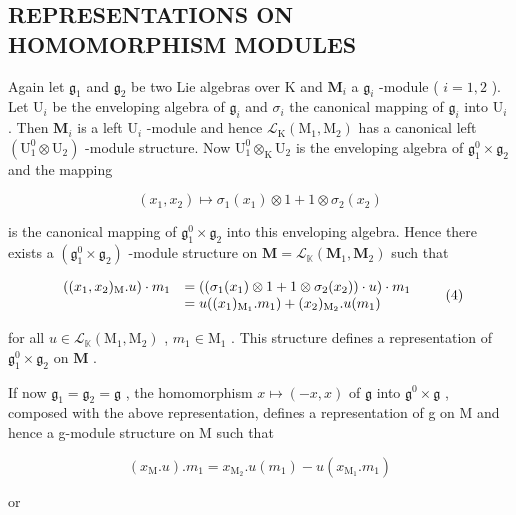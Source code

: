 \subsection{REPRESENTATIONS ON HOMOMORPHISM MODULES}

Again let \(\mathfrak{g}_1\) and \(\mathfrak{g}_2\) be two Lie algebras over K and \(\mathbf{M}_i\) a \(\mathfrak{g}_i\) -module ( \(i = 1, 2\) ). Let \(\mathrm{U}_i\) be the enveloping algebra of \(\mathfrak{g}_i\) and \(\sigma_i\) the canonical mapping of \(\mathfrak{g}_i\) into \(\mathrm{U}_i\) . Then \(\mathbf{M}_i\) is a left \(\mathrm{U}_i\) -module and hence \(\mathcal{L}_{\mathrm{K}}(\mathrm{M}_1, \mathrm{M}_2)\) has a canonical left \((\mathrm{U}_1^0 \otimes \mathrm{U}_2)\) -module structure. Now \(\mathrm{U}_1^0 \otimes_{\mathrm{K}} \mathrm{U}_2\) is the enveloping algebra of \(\mathfrak{g}_1^0 \times \mathfrak{g}_2\) and the mapping

\[
(x _ {1}, x _ {2}) \mapsto \sigma_ {1} (x _ {1}) \otimes 1 + 1 \otimes \sigma_ {2} (x _ {2})
\]

is the canonical mapping of \(\mathfrak{g}_1^0\times \mathfrak{g}_2\) into this enveloping algebra. Hence there exists a \((\mathfrak{g}_1^0\times \mathfrak{g}_2)\) -module structure on \(\mathbf{M} = \mathcal{L}_{\mathbb{K}}(\mathbf{M}_1,\mathbf{M}_2)\) such that

\[
\begin{array}{r l} ((x _ {1}, x _ {2}) _ {\mathrm{M}}. u) \cdot m _ {1} & = ((\sigma_ {1} (x _ {1}) \otimes 1 + 1 \otimes \sigma_ {2} (x _ {2})) \cdot u) \cdot m _ {1} \\ & = u ((x _ {1}) _ {\mathrm{M} _ {1}}. m _ {1}) + (x _ {2}) _ {\mathrm{M} _ {2}}. u (m _ {1}) \end{array}\tag{4}
\]

for all \(u \in \mathcal{L}_{\mathbb{K}}(\mathrm{M}_1, \mathrm{M}_2)\) , \(m_1 \in \mathrm{M}_1\) . This structure defines a representation of \(\mathfrak{g}_1^0 \times \mathfrak{g}_2\) on \(\mathbf{M}\) .

If now \(\mathfrak{g}_1 = \mathfrak{g}_2 = \mathfrak{g}\) , the homomorphism \(x \mapsto (-x, x)\) of \(\mathfrak{g}\) into \(\mathfrak{g}^0 \times \mathfrak{g}\) , composed with the above representation, defines a representation of g on M and hence a g-module structure on M such that

\[
(x _ {\mathrm{M}}. u). m _ {1} = x _ {\mathrm{M} _ {2}}. u (m _ {1}) - u (x _ {\mathrm{M} _ {1}}. m _ {1})\tag{5}
\]

or

